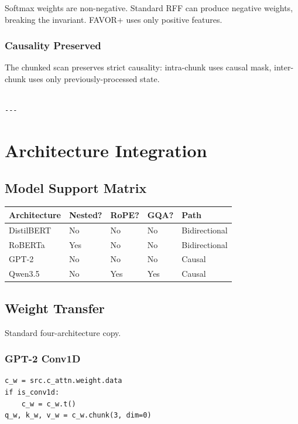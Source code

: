 Softmax weights are non-negative. Standard RFF can produce negative 
weights, breaking the invariant. FAVOR+ uses only positive features.

\subsubsection{Causality Preserved}

The chunked scan preserves strict causality: intra-chunk uses causal mask, 
inter-chunk uses only previously-processed state.
\begin{lstlisting}

---
\end{lstlisting}


\section{Architecture Integration}

\subsection{Model Support Matrix}

\begin{table}[H]
\centering
\small
\begin{tabular}{lllll}
\toprule
\textbf{Architecture} & \textbf{Nested?} & \textbf{RoPE?} & \textbf{GQA?} & \textbf{Path} \\
\midrule
DistilBERT & No & No & No & Bidirectional \\
RoBERTa & Yes & No & No & Bidirectional \\
GPT-2 & No & No & No & Causal \\
Qwen3.5 & No & Yes & Yes & Causal \\
\bottomrule
\end{tabular}
\end{table}

\subsection{Weight Transfer}

Standard four-architecture copy.

\subsubsection{GPT-2 Conv1D}

\begin{lstlisting}
c_w = src.c_attn.weight.data
if is_conv1d:
    c_w = c_w.t()
q_w, k_w, v_w = c_w.chunk(3, dim=0)
\end{lstlisting}

